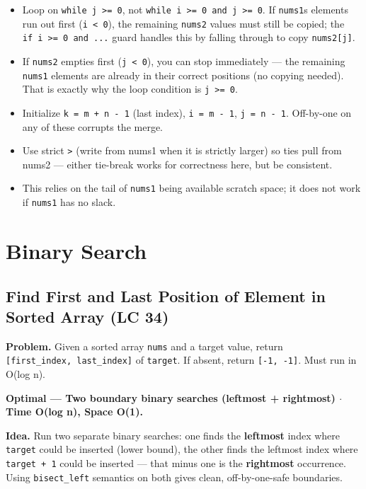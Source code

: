 \documentclass[11pt]{article}
\providecommand{\tightlist}{\setlength{\itemsep}{1pt}\setlength{\parskip}{0pt}}
\begin{document}
\begin{itemize}
\tightlist
\item
  Loop on \texttt{while\ j\ \textgreater{}=\ 0}, not \texttt{while\ i\ \textgreater{}=\ 0\ and\ j\ \textgreater{}=\ 0}. If \texttt{nums1}\textquotesingle s elements run out first (\texttt{i\ \textless{}\ 0}), the remaining \texttt{nums2} values must still be copied; the \texttt{if\ i\ \textgreater{}=\ 0\ and\ ...} guard handles this by falling through to copy \texttt{nums2{[}j{]}}.
\item
  If \texttt{nums2} empties first (\texttt{j\ \textless{}\ 0}), you can stop immediately --- the remaining \texttt{nums1} elements are already in their correct positions (no copying needed). That is exactly why the loop condition is \texttt{j\ \textgreater{}=\ 0}.
\item
  Initialize \texttt{k\ =\ m\ +\ n\ -\ 1} (last index), \texttt{i\ =\ m\ -\ 1}, \texttt{j\ =\ n\ -\ 1}. Off-by-one on any of these corrupts the merge.
\item
  Use strict \texttt{\textgreater{}} (write from nums1 when it is strictly larger) so ties pull from nums2 --- either tie-break works for correctness here, but be consistent.
\item
  This relies on the tail of \texttt{nums1} being available scratch space; it does not work if \texttt{nums1} has no slack.
\end{itemize}

\section{Binary Search}\label{binary-search}

\subsection{Find First and Last Position of Element in Sorted Array (LC 34)}\label{find-first-and-last-position-of-element-in-sorted-array-lc-34}

\textbf{Problem.} Given a sorted array \texttt{nums} and a target value, return \texttt{{[}first\_index,\ last\_index{]}} of \texttt{target}. If absent, return \texttt{{[}-1,\ -1{]}}. Must run in O(log n).

\textbf{Optimal --- Two boundary binary searches (leftmost + rightmost) \(\cdot\) Time O(log n), Space O(1).}

\textbf{Idea.} Run two separate binary searches: one finds the \textbf{leftmost} index where \texttt{target} could be inserted (lower bound), the other finds the leftmost index where \texttt{target\ +\ 1} could be inserted --- that minus one is the \textbf{rightmost} occurrence. Using \texttt{bisect\_left} semantics on both gives clean, off-by-one-safe boundaries.
\end{document}
